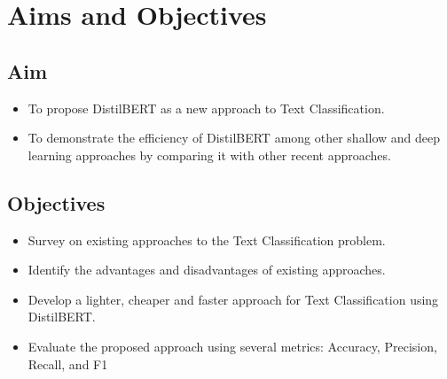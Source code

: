 \section{Aims and Objectives}
\subsection{Aim}
\begin{itemize}
\item To propose DistilBERT as a new approach to Text Classification.
\item To demonstrate the efficiency of DistilBERT among other shallow and deep learning approaches by comparing it with other recent approaches.
\end{itemize}

\subsection{Objectives}
\begin{itemize}
\item Survey on existing approaches to the Text Classification problem.
\item Identify the advantages and disadvantages of existing approaches.
\item Develop a lighter, cheaper and faster approach for Text Classification using DistilBERT.
\item Evaluate the proposed approach using several metrics: Accuracy, Precision, Recall, and F1
\end{itemize}
